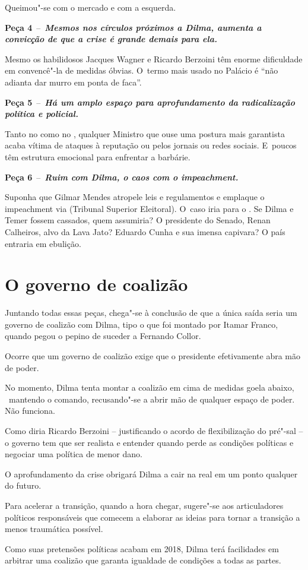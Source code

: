 Queimou"-se com o mercado e com a esquerda.

\textbf{Peça 4}~--~\textbf{\emph{Mesmos nos círculos próximos a Dilma,
aumenta a convicção de que a crise é grande demais para ela.}}

Mesmo os habilidosos Jacques Wagner e Ricardo Berzoini têm enorme
dificuldade em convencê"-la de medidas óbvias. O~termo mais usado no
Palácio é ``não adianta dar murro em ponta de faca''.

\textbf{Peça 5}~--~\textbf{\emph{Há um amplo espaço para aprofundamento
da radicalização política e policial.}}

Tanto no  como no , qualquer Ministro que ouse uma postura mais
garantista acaba vítima de ataques à reputação ou pelos jornais ou redes
sociais. E~poucos têm estrutura emocional para enfrentar a barbárie.

\textbf{Peça 6}~--~\textbf{\emph{Ruim com Dilma, o caos com o
impeachment.}}

Suponha que Gilmar Mendes atropele leis e regulamentos e emplaque o
impeachment via  (Tribunal Superior Eleitoral). O~caso iria para o
. Se Dilma e Temer fossem cassados, quem assumiria? O presidente do
Senado, Renan Calheiros, alvo da Lava Jato? Eduardo Cunha e sua imensa
capivara? O país entraria em ebulição.

\section{O governo de coalizão}

Juntando todas essas peças, chega"-se à conclusão de que a única saída
seria um governo de coalizão com Dilma, tipo o que foi montado por
Itamar Franco,~ quando pegou o pepino de suceder a Fernando Collor.

Ocorre que um governo de coalizão exige que o presidente efetivamente
abra mão de poder.

No momento, Dilma tenta montar a coalizão em cima de medidas goela
abaixo, ~mantendo o comando, recusando"-se a abrir mão de qualquer espaço
de poder. Não funciona.

Como diria Ricardo Berzoini -- justificando o acordo de flexibilização
do pré"-sal -- o governo tem que ser realista e entender quando perde as
condições políticas e negociar uma política de menor dano.

O aprofundamento da crise obrigará Dilma a cair na real em um ponto
qualquer do futuro.

Para acelerar a transição, quando a hora chegar, sugere"-se aos
articuladores políticos responsáveis que comecem a elaborar as ideias
para tornar a transição a menos traumática possível.

Como suas pretensões políticas acabam em 2018, Dilma terá facilidades em
arbitrar uma coalizão que garanta igualdade de condições a todas as
partes.
